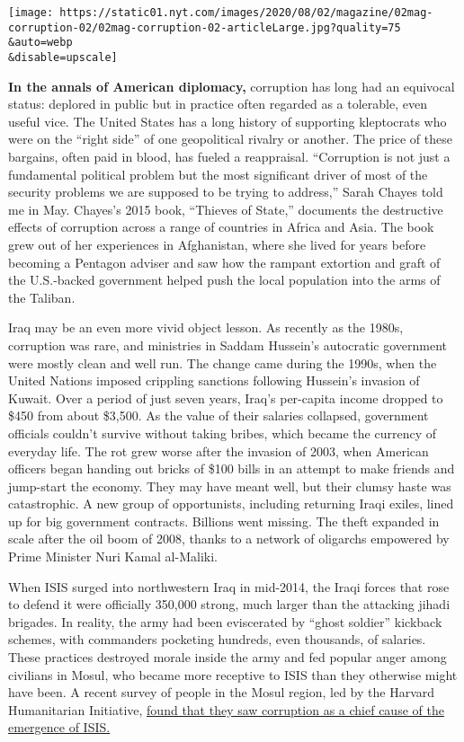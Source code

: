 \texttt{[image: https://static01.nyt.com/images/2020/08/02/magazine/02mag-corruption-02/02mag-corruption-02-articleLarge.jpg?quality=75\\\&auto=webp\\\&disable=upscale]}

\textbf{In the annals of American diplomacy,} corruption has long had an
equivocal status: deplored in public but in practice often regarded as a
tolerable, even useful vice. The United States has a long history of
supporting kleptocrats who were on the ``right side'' of one
geopolitical rivalry or another. The price of these bargains, often paid
in blood, has fueled a reappraisal. ``Corruption is not just a
fundamental political problem but the most significant driver of most of
the security problems we are supposed to be trying to address,'' Sarah
Chayes told me in May. Chayes's 2015 book, ``Thieves of State,''
documents the destructive effects of corruption across a range of
countries in Africa and Asia. The book grew out of her experiences in
Afghanistan, where she lived for years before becoming a Pentagon
adviser and saw how the rampant extortion and graft of the U.S.-backed
government helped push the local population into the arms of the
Taliban.

Iraq may be an even more vivid object lesson. As recently as the 1980s,
corruption was rare, and ministries in Saddam Hussein's autocratic
government were mostly clean and well run. The change came during the
1990s, when the United Nations imposed crippling sanctions following
Hussein's invasion of Kuwait. Over a period of just seven years, Iraq's
per-capita income dropped to \$450 from about \$3,500. As the value of
their salaries collapsed, government officials couldn't survive without
taking bribes, which became the currency of everyday life. The rot grew
worse after the invasion of 2003, when American officers began handing
out bricks of \$100 bills in an attempt to make friends and jump-start
the economy. They may have meant well, but their clumsy haste was
catastrophic. A new group of opportunists, including returning Iraqi
exiles, lined up for big government contracts. Billions went missing.
The theft expanded in scale after the oil boom of 2008, thanks to a
network of oligarchs empowered by Prime Minister Nuri Kamal al-Maliki.

When ISIS surged into northwestern Iraq in mid-2014, the Iraqi forces
that rose to defend it were officially 350,000 strong, much larger than
the attacking jihadi brigades. In reality, the army had been eviscerated
by ``ghost soldier'' kickback schemes, with commanders pocketing
hundreds, even thousands, of salaries. These practices destroyed morale
inside the army and fed popular anger among civilians in Mosul, who
became more receptive to ISIS than they otherwise might have been. A
recent survey of people in the Mosul region, led by the Harvard
Humanitarian Initiative,
\href{https://hhi.harvard.edu/publications/english-version-never-forget-views-peace-and-justice-within-conflict-affected}{found
that they saw corruption as a chief cause of the emergence of ISIS.}

